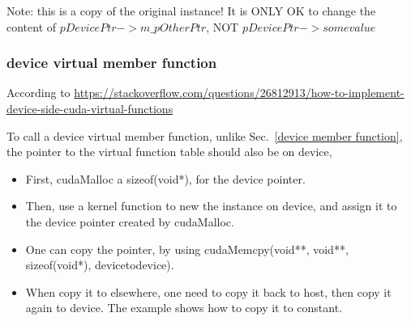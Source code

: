 \textcolor[rgb]{1,0,0}{Note: this is a copy of the original instance! It is ONLY OK to change the content of $pDevicePtr->m\_pOtherPtr$, NOT $pDevicePtr->somevalue$}

\subsubsection{\label{device virtual member function}device virtual member function}

According to \href{https://stackoverflow.com/questions/26812913/how-to-implement-device-side-cuda-virtual-functions}{https://stackoverflow.com/questions/26812913/how-to-implement-device-side-cuda-virtual-functions} 

To call a device virtual member function, unlike Sec.~\ref{device member function}, the pointer to the virtual function table should also be on device, 

\begin{itemize}
  \item First, cudaMalloc a sizeof(void*), for the device pointer.
  \item Then, use a kernel function to new the instance on device, and assign it to the device pointer created by cudaMalloc.
  \item One can copy the pointer, by using cudaMemcpy(void**, void**, sizeof(void*), devicetodevice).
  \item When copy it to elsewhere, one need to copy it back to host, then copy it again to device. The example shows how to copy it to constant.
\end{itemize}

